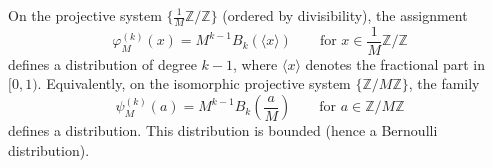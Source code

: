 On the projective system $\{\frac{1}{M}\mathbb{Z}/\mathbb{Z}\}$ (ordered by divisibility), the assignment
$$\varphi_M^{(k)}(x) = M^{k-1} B_k\!\left( \langle x \rangle \right) \qquad \text{for } x \in \frac{1}{M}\mathbb{Z}/\mathbb{Z}$$
defines a distribution of degree $k-1$, where $\langle x \rangle$ denotes the fractional part in $[0,1)$. Equivalently, on the isomorphic projective system $\{\mathbb{Z}/M\mathbb{Z}\}$, the family
$$\psi_M^{(k)}(a) = M^{k-1} B_k\!\left( \frac{a}{M} \right) \qquad \text{for } a \in \mathbb{Z}/M\mathbb{Z}$$
defines a distribution. This distribution is bounded (hence a Bernoulli distribution).

